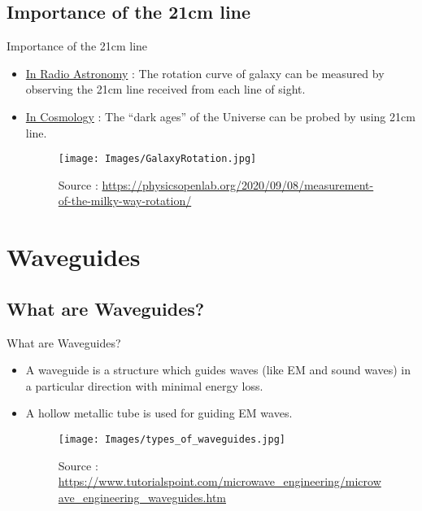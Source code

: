 \documentclass[12pt, dvipsnames]{beamer}
\begin{document}
\subsection{Importance of the 21cm line}
\begin{frame}{Importance of the 21cm line}
    \begin{itemize} 
        \item \uline{In Radio Astronomy} : The rotation curve of galaxy can be measured by observing the 21cm line received from each line of sight.
        \item \uline{In Cosmology} : The ``dark ages'' of the Universe can be probed by using 21cm line.
        \begin{figure}
            \centering
            \texttt{[image: Images/GalaxyRotation.jpg]}
            \caption{Source : \url{https://physicsopenlab.org/2020/09/08/measurement-of-the-milky-way-rotation/}}
        \end{figure}
    \end{itemize}
\end{frame}

% 
\section{Waveguides}
\subsection{What are Waveguides?}
\begin{frame}{What are Waveguides?}
    \begin{itemize}
        \item A waveguide is a structure which guides waves (like EM and sound waves) in a particular direction with minimal energy loss.
        \item A hollow metallic tube is used for guiding EM waves.
        \begin{figure}
            \centering
            \texttt{[image: Images/types\_of\_waveguides.jpg]}
            \caption{Source : \url{https://www.tutorialspoint.com/microwave_engineering/microwave_engineering_waveguides.htm}}
        \end{figure}
    \end{itemize}
\end{frame}
\end{document}
